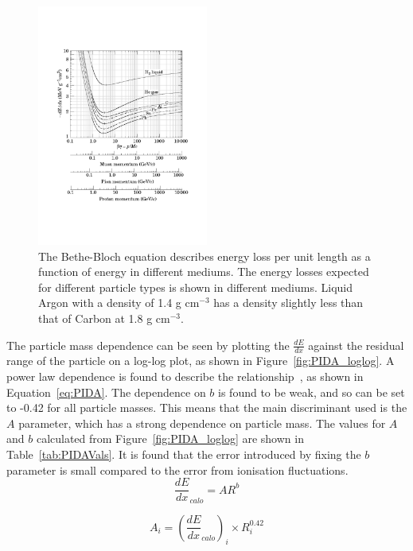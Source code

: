 \begin{figure}[h!]
  \centering
  \includegraphics[width=0.5\textwidth]{BetheBlock}
  \caption[The medium and particle type dependence of the Bethe-Bloch equation]
          {The Bethe-Bloch equation describes energy loss per unit length as a function of energy in different mediums. The energy losses expected for different particle types is shown in different mediums. Liquid Argon with a density of 1.4 g cm$^{-3}$ has a density slightly less than that of Carbon at 1.8 g cm$^{-3}$.}
  \label{fig:BetheBloch}
\end{figure}

The particle mass dependence can be seen by plotting the $\frac{dE}{dx}$ against the residual range of the particle on a log-log plot, as shown in Figure~\ref{fig:PIDA_loglog}. A power law dependence is found to describe the relationship~\citep{PIDA_Paper}, as shown in Equation~\ref{eq:PIDA}. The dependence on $b$ is found to be weak, and so can be set to -0.42 for all particle masses. This means that the main discriminant used is the $A$ parameter, which has a strong dependence on particle mass. The values for $A$ and $b$ calculated from Figure~\ref{fig:PIDA_loglog} are shown in Table~\ref{tab:PIDAVals}. It is found that the error introduced by fixing the $b$ parameter is small compared to the error from ionisation fluctuations. \\

\begin{equation}
  \label{eq:PIDA}
  \frac{dE}{dx}_{calo} = A R^b
\end{equation}

\begin{equation}
  \label{eq:PIDA_A}
  A_i = (\frac{dE}{dx}_{calo})_i \times R^{0.42}_i
\end{equation}

